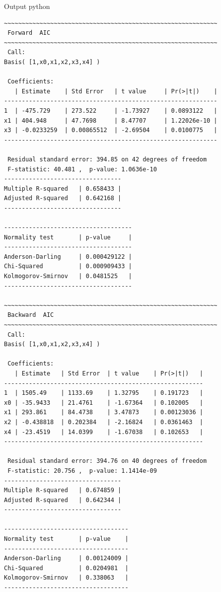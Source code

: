 \newpage
Output python
\begin{lstlisting}[style=output,basicstyle=\tiny]
~~~~~~~~~~~~~~~~~~~~~~~~~~~~~~~~~~~~~~~~~~~~~~~~~~~~~~~~~~~~
 Forward  AIC 
~~~~~~~~~~~~~~~~~~~~~~~~~~~~~~~~~~~~~~~~~~~~~~~~~~~~~~~~~~~~
 Call:
Basis( [1,x0,x1,x2,x3,x4] )

 Coefficients:
   | Estimate    | Std Error   | t value     | Pr(>|t|)    | 
------------------------------------------------------------
1  | -475.729    | 273.522     | -1.73927    | 0.0893122   | 
x1 | 404.948     | 47.7698     | 8.47707     | 1.22026e-10 | 
x3 | -0.0233259  | 0.00865512  | -2.69504    | 0.0100775   | 
------------------------------------------------------------

 Residual standard error: 394.85 on 42 degrees of freedom 
 F-statistic: 40.481 ,  p-value: 1.0636e-10
---------------------------------
Multiple R-squared   | 0.658433 | 
Adjusted R-squared   | 0.642168 | 
---------------------------------

------------------------------------
Normality test       | p-value     | 
------------------------------------
Anderson-Darling     | 0.000429122 | 
Chi-Squared          | 0.000909433 | 
Kolmogorov-Smirnov   | 0.0481525   | 
------------------------------------

~~~~~~~~~~~~~~~~~~~~~~~~~~~~~~~~~~~~~~~~~~~~~~~~~~~~~~~~~~~~
 Backward  AIC 
~~~~~~~~~~~~~~~~~~~~~~~~~~~~~~~~~~~~~~~~~~~~~~~~~~~~~~~~~~~~
 Call:
Basis( [1,x0,x1,x2,x3,x4] )

 Coefficients:
   | Estimate   | Std Error  | t value    | Pr(>|t|)   | 
--------------------------------------------------------
1  | 1505.49    | 1133.69    | 1.32795    | 0.191723   | 
x0 | -35.9433   | 21.4761    | -1.67364   | 0.102005   | 
x1 | 293.861    | 84.4738    | 3.47873    | 0.00123036 | 
x2 | -0.438818  | 0.202384   | -2.16824   | 0.0361463  | 
x4 | -23.4519   | 14.0399    | -1.67038   | 0.102653   | 
--------------------------------------------------------

 Residual standard error: 394.76 on 40 degrees of freedom 
 F-statistic: 20.756 ,  p-value: 1.1414e-09
---------------------------------
Multiple R-squared   | 0.674859 | 
Adjusted R-squared   | 0.642344 | 
---------------------------------

-----------------------------------
Normality test       | p-value    | 
-----------------------------------
Anderson-Darling     | 0.00124009 | 
Chi-Squared          | 0.0204981  | 
Kolmogorov-Smirnov   | 0.338063   | 
-----------------------------------


\end{lstlisting}
